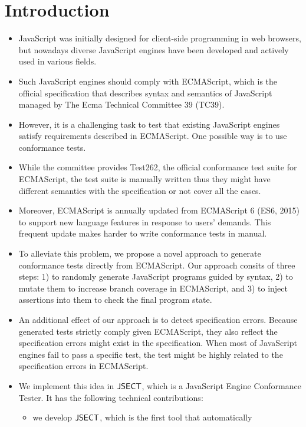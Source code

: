 \section{Introduction}\label{sec:intro}
\begin{itemize}
  \item JavaScript was initially designed for client-side programming in web
    browsers, but nowadays diverse JavaScript engines have been developed and
    actively used in various fields.
  \item Such JavaScript engines should comply with ECMAScript, which is the
    official specification that describes syntax and semantics of JavaScript
    managed by The Ecma Technical Committee 39 (TC39).
  \item However, it is a challenging task to test that existing JavaScript
    engines satisfy requirements described in ECMAScript.  One possible way is
    to use conformance tests.
  \item While the committee provides Test262, the official conformance test
    suite for ECMAScript, the test suite is manually written thus they might
    have different semantics with the specification or not cover all the cases.
  \item Moreover, ECMAScript is annually updated from ECMAScript 6 (ES6, 2015)
    to support new language features in response to users' demands.  This frequent
    update makes harder to write conformance tests in manual.
  \item To alleviate this problem, we propose a novel approach to generate
    conformance tests directly from ECMAScript. Our approach consits of three
    steps: 1) to randomly generate JavaScript programs guided by syntax, 2)
    to mutate them to increase branch coverage in ECMAScript, and 3) to inject
    assertions into them to check the final program state.
  \item An additional effect of our approach is to detect specification errors.
    Because generated tests strictly comply given ECMAScript, they also reflect
    the specification errors might exist in the specification.  When most of
    JavaScript engines fail to pass a specific test, the test might be highly
    related to the specification errors in ECMAScript.
  \item We implement this idea in $\text{\sf JSECT}$, which is a JavaScript Engine
    Conformance Tester.  It has the following technical contributions:
    \begin{itemize}
      \item we develop $\text{\sf JSECT}$, which is the first tool that automatically

\end{itemize}
\end{itemize}
